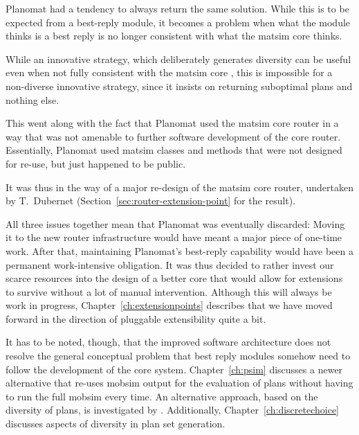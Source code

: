 \begin{compactitem}
\item Planomat had a tendency to always return the same solution. While this is to be expected from a best-reply module, it becomes a problem when what the module thinks is a best reply is no longer consistent with what the \gls{matsim} core thinks.  

While an innovative strategy, which deliberately generates diversity can be useful even when not fully consistent with the \gls{matsim} core \citep{NagelKickhoeferJoubert2014HeterogeneousVoTsPROCEDIA}, this is impossible for a non-diverse innovative strategy, since it insists on returning suboptimal plans and nothing else.

\item This went along with the fact that Planomat used the \gls{matsim} core router in a way that was not amenable to further software development of the core router. Essentially, Planomat used \gls{matsim} classes and methods that were not designed for re-use, but just happened to be public.

It was thus in the way of a major re-design of the \gls{matsim} core router, undertaken by T.~Dubernet (Section~\ref{sec:router-extension-point} for the result).

\end{compactitem}

All three issues together mean that Planomat was eventually discarded: Moving it to the new router infrastructure would have meant a major piece of one-time work. After that, maintaining Planomat's best-reply capability would have been a permanent work-intensive obligation. It was thus decided to rather invest our scarce resources into the design of a better core that would allow for extensions to survive without a lot of manual intervention. Although this will always be work in progress, Chapter~\ref{ch:extensionpoints} describes that we have moved forward in the direction of pluggable extensibility quite a bit.

It has to be noted, though, that the improved software architecture does not resolve the general conceptual problem that best reply modules somehow need to follow the development of the core system. Chapter~\ref{ch:psim} discusses a newer alternative that re-uses \gls{mobsim} output for the evaluation of plans without having to run the full \gls{mobsim} every time. An alternative approach, based on the diversity of plans, is investigated by \cite{NagelKickhoeferJoubert2014HeterogeneousVoTsPROCEDIA}. Additionally, Chapter~\ref{ch:discretechoice} discusses aspects of diversity in plan set generation.

